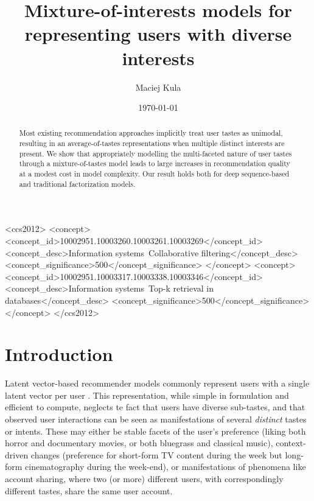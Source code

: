 \documentclass[sigconf]{acmart}
\begin{document}
\title{Mixture-of-interests models for representing users with diverse interests}
\author{Maciej Kula}
\date{\today}
\acmConference[]{}{}{}

\begin{CCSXML}
<ccs2012>
<concept>
<concept_id>10002951.10003260.10003261.10003269</concept_id>
<concept_desc>Information systems~Collaborative filtering</concept_desc>
<concept_significance>500</concept_significance>
</concept>
<concept>
<concept_id>10002951.10003317.10003338.10003346</concept_id>
<concept_desc>Information systems~Top-k retrieval in databases</concept_desc>
<concept_significance>500</concept_significance>
</concept>
</ccs2012>
\end{CCSXML}




\begin{abstract}
Most existing recommendation approaches implicitly treat user tastes as unimodal, resulting in an average-of-tastes representations when multiple distinct interests are present. We show that appropriately modelling the multi-faceted nature of user tastes through a mixture-of-tastes model leads to large increases in recommendation quality at a modest cost in model complexity. Our result holds both for deep sequence-based and traditional factorization models. 
\end{abstract}

\maketitle


\section{Introduction}
Latent vector-based recommender models commonly represent users with a single latent vector per user \citep{koren2009bellkor, hu2008collaborative}. This representation, while simple in formulation and efficient to compute, neglects te fact that users have diverse sub-tastes, and that observed user interactions can be seen as manifestations of several \emph{distinct} tastes or intents. These may either be stable facets of the user's preference (liking both horror and documentary movies, or both bluegrass and classical music), context-driven changes (preference for short-form TV content during the week but long-form cinematography during the week-end), or manifestations of phenomena like account sharing, where two (or more) different users, with correspondingly different tastes, share the same user account.
\end{document}
